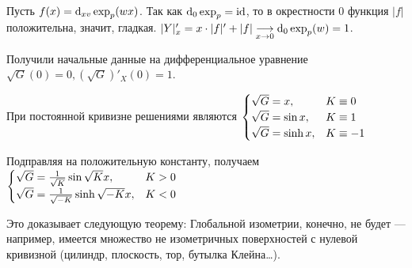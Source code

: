 \documentclass[a4paper]{report}
\begin{document}
    Пусть $f(x) = \operatorname{d}\!_{xv}\exp_p(wx)$.
    Так как $\operatorname{d}\!_0 \exp_p = \operatorname{id}$, то в окрестности $0$ функция $|f|$ положительна, значит, гладкая.
    $|Y|'_{x} = x \cdot |f|' + |f| \underset{x \to 0}{\longrightarrow} \operatorname{d}\!_0\exp_p(w) = 1$.

    Получили начальные данные на дифференциальное уравнение $\sqrt{G}(0) = 0, \left(\sqrt{G}\right)'_X(0) = 1$.

    При постоянной кривизне решениями являются $\begin{cases}\sqrt{G} = x, & K \equiv 0 \\ \sqrt{G} = \sin x, & K \equiv 1 \\ \sqrt{G} = \sinh x, & K \equiv -1\end{cases}$

    Подправляя на положительную константу, получаем $\begin{cases}\sqrt{G} = \frac{1}{\sqrt{K}}\sin\sqrt{K} x, & K > 0  \\ \sqrt{G} = \frac{1}{\sqrt{-K}}\sinh \sqrt{-K}x, & K < 0\end{cases}$

    Это доказывает следующую теорему:
    Глобальной изометрии, конечно, не будет --- например, имеется множество не изометричных поверхностей с нулевой кривизной (цилиндр, плоскость, тор, бутылка Клейна\dots).
\end{document}
